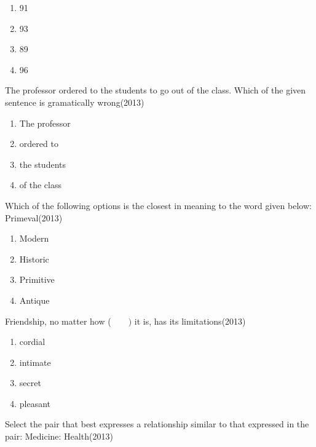    \begin{multicols}{4}
			\begin{enumerate}
\item 91
\item  93
\item89
\item 96
   \end{enumerate}
		\end{multicols}
  \item The professor ordered to the students to go out of the class.
Which of the given sentence is gramatically wrong(\hfill{2013})


   \begin{multicols}{4}
			\begin{enumerate}
   \item  The professor
\item ordered  to
\item the students
\item of the class
\end{enumerate}
		\end{multicols}
  \item Which of the following options is the closest in meaning to the word given below:\\
  Primeval(\hfill{2013})

   \begin{multicols}{4}
			\begin{enumerate}
   \item  Modern
\item Historic
\item Primitive 
\item Antique
\end{enumerate}
		\end{multicols}
  \item Friendship, no matter how ($\qquad)$ it is, has its limitations(\hfill{2013})

  \begin{multicols}{4}
			\begin{enumerate}
\item cordial
\item intimate
\item secret
\item pleasant
\end{enumerate}
		\end{multicols}
  \item Select the pair that best expresses a relationship similar to that expressed in the pair: Medicine: Health(\hfill{2013})

